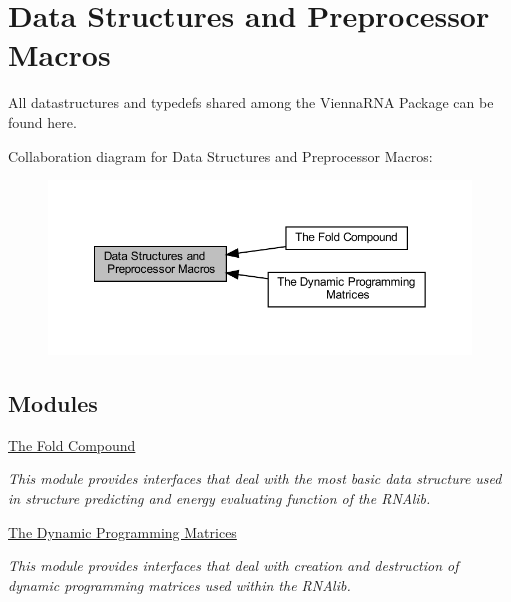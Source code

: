 \hypertarget{group__data__structures}{}\section{Data Structures and Preprocessor Macros}
\label{group__data__structures}


All datastructures and typedefs shared among the Vienna\+R\+NA Package can be found here.  


Collaboration diagram for Data Structures and Preprocessor Macros\+:
\nopagebreak
\begin{figure}[H]
\begin{center}
\leavevmode
\includegraphics[width=350pt]{group__data__structures}
\end{center}
\end{figure}
\subsection*{Modules}
\begin{DoxyCompactItemize}
\item 
\hyperlink{group__fold__compound}{The Fold Compound}
\begin{DoxyCompactList}\small\item\em This module provides interfaces that deal with the most basic data structure used in structure predicting and energy evaluating function of the R\+N\+Alib. \end{DoxyCompactList}\item 
\hyperlink{group__dp__matrices}{The Dynamic Programming Matrices}
\begin{DoxyCompactList}\small\item\em This module provides interfaces that deal with creation and destruction of dynamic programming matrices used within the R\+N\+Alib. \end{DoxyCompactList}\end{DoxyCompactItemize}

